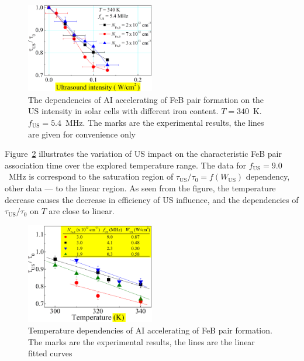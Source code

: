 \documentclass[sn-mathphys]{sn-jnl}%
\theoremstyle{thmstyleone}%
\theoremstyle{thmstyletwo}%
\theoremstyle{thmstylethree}%
\begin{document}

\begin{figure}
\centering
 \includegraphics[width=0.5\textwidth]{Fig5}
\caption{
The dependencies of AI accelerating of FeB pair formation on the US intensity
in solar cells with different iron content.
$T=340$~K.
$f_\mathrm{US}=5.4$~MHz.
The marks are the experimental results, the lines are given for convenience only
}
\label{figNFe}       %
\end{figure}

Figure~\ref{figTemp} illustrates the variation of US impact on
the characteristic FeB pair association time over the explored temperature range.
The data for $f_\mathrm{US}=9.0$~MHz is correspond to the saturation region of
$\tau_\mathrm{US}/\tau_{0}=f(W_\mathrm{US})$ dependency,
other data --- to the linear region.
As seen from the figure, the temperature decrease causes the decrease in efficiency of US influence,
and the dependencies of $\tau_\mathrm{US}/\tau_{0}$ on $T$ are close to linear.


\begin{figure}
\centering
 \includegraphics[width=0.5\textwidth]{Fig6}
\caption{
Temperature dependencies of AI accelerating of FeB pair formation.
The marks are the experimental results, the lines are the linear fitted curves
}
\label{figTemp}       %
\end{figure}
\end{document}

